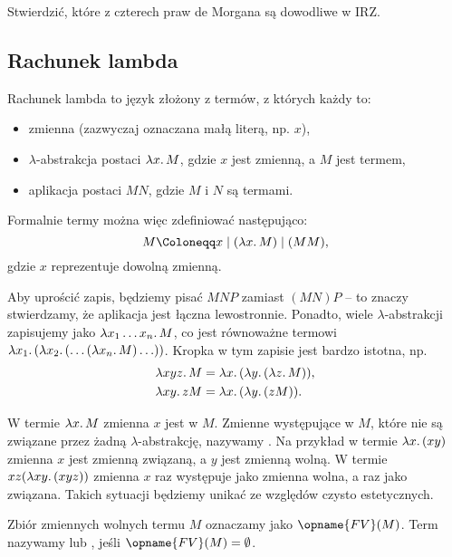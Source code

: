 \documentclass[polish,pretty]{angav}
\newcommand{\FV}{\opname{FV}}
\begin{document}
\begin{problem}
    Stwierdzić, które z czterech praw de Morgana są dowodliwe w IRZ.
\end{problem}

\subsection{Rachunek lambda}

Rachunek lambda to język złożony z termów, z których każdy to:
\begin{itemize}
    \item zmienna (zazwyczaj oznaczana małą literą, np. $x$),
    \item $\lambda$-abstrakcja postaci $\lambda x\ldotp M$, gdzie $x$ jest zmienną, a $M$ jest termem,
    \item aplikacja postaci $MN$, gdzie $M$ i $N$ są termami.
\end{itemize}

Formalnie termy można więc zdefiniować następująco:
\[ M \Coloneqq x \mid (\lambda x\ldotp M) \mid (MM), \]
gdzie $x$ reprezentuje dowolną zmienną.

Aby uprościć zapis, będziemy pisać $MNP$ zamiast $(MN)P$ -- to znaczy stwierdzamy, że aplikacja jest łączna lewostronnie. Ponadto, wiele $\lambda$-abstrakcji zapisujemy jako $\lambda x_1 \ldots x_n\ldotp M$, co jest równoważne termowi $\lambda x_1\ldotp (\lambda x_2\ldotp (\ldots (\lambda x_n\ldotp M) \ldots))$. Kropka w tym zapisie jest bardzo istotna, np.
\begin{align*}
    \lambda xyz\ldotp M &= \lambda x\ldotp (\lambda y\ldotp (\lambda z\ldotp M)), \\
    \lambda xy\ldotp z M &= \lambda x\ldotp (\lambda y\ldotp (z M)).
\end{align*}

W termie $\lambda x\ldotp M$ zmienna $x$ jest  w $M$.
Zmienne występujące w $M$, które nie są związane przez żadną $\lambda$-abstrakcję, nazywamy .
Na przykład w termie $\lambda x\ldotp (x y)$ zmienna $x$ jest zmienną związaną, a $y$ jest zmienną wolną.
W termie $xz(\lambda xy\ldotp (xyz))$ zmienna $x$ raz występuje jako zmienna wolna, a raz jako związana. Takich sytuacji będziemy unikać ze względów czysto estetycznych.

Zbiór zmiennych wolnych termu $M$ oznaczamy jako $\FV(M)$.
Term nazywamy  lub , jeśli $\FV(M) = \emptyset$.
\end{document}
